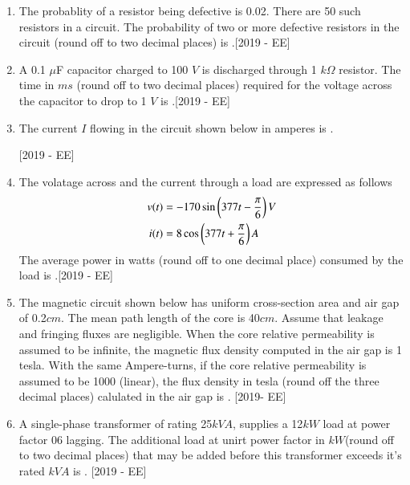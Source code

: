 \documentclass[journal]{IEEEtran}
\begin{document}
\begin{enumerate}
    \item The probablity of a resistor being defective is 0.02. There are 50 such resistors in a circuit. The probability of two or more defective resistors in the circuit (round off to two decimal places) is \underline{\hspace{3cm}}.\hfill{[2019 - EE]}
    \item A 0.1 $\mu$F capacitor charged to 100 $V$ is discharged through  1 $k\Omega$ resistor. The time in $ms$ (round off to two decimal places) required for the voltage across the capacitor to drop to 1 $V$ is \underline{\hspace{3cm}}.\hfill{[2019 - EE]}
    \item The current $I$ flowing in the circuit shown below in amperes is \underline{\hspace{3cm}}.\hfill\\\strut\hfill{[2019 - EE]}\\
        \begin{center}
            
        \end{center}
    \item The volatage across and the current through a load are expressed as follows 
        \begin{align*}v(t) &= -170 \sin \left(377t - \frac{\pi}{6}\right) V\\i(t) &= 8\cos\left(377t+\frac{\pi}{6}\right) A\end{align*}
        The average power in watts (round off to one decimal place) consumed by the load is \underline{\hspace{3cm}}.\hfill{[2019 - EE]}
    \item The magnetic circuit shown below has uniform cross-section area and air gap of 0.2$cm$. The mean path length of the core is 40$cm$. Assume that leakage and fringing fluxes are negligible. When the core relative permeability is assumed to be infinite, the magnetic flux density computed in the air gap is 1 tesla. With the same Ampere-turns, if the core relative permeability is assumed to be 1000 (linear), the flux density in tesla (round off the three decimal places) calulated in the air gap is \underline{\hspace{3cm}}. \hfill{[2019- EE]}
        \begin{center}
            
        \end{center}
\item A single-phase transformer of rating 25$kVA$, supplies a 12$kW$ load at power factor 06 lagging. The additional load at unirt power factor in $kW$(round off to two decimal places) that may be added before this transformer exceeds it's rated $kVA$ is \underline{\hspace{3cm}}. \hfill{[2019 - EE]}

\end{enumerate}
\end{document}
